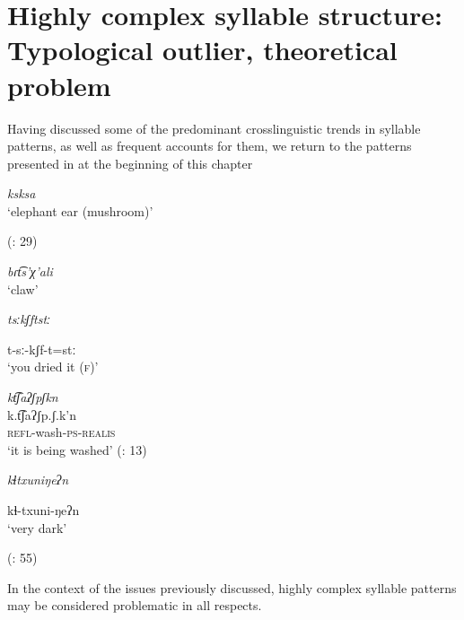 \section{Highly complex syllable structure: Typological outlier, theoretical problem}\label{sec:1.2}

  Having discussed some of the predominant crosslinguistic trends in syllable patterns, as well as frequent accounts for them, we return to the patterns presented in at the beginning of this chapter 

\ea\label{ex:1.8}

\textit{ksksa}\\
\glt ‘elephant ear (mushroom)’

(\citealt{HargusBeavert2006}: 29)
\z

\ea\label{ex:1.9}

\textit{bɾt͡s’χ’ali}\\
\glt ‘claw’
\citep[204]{Butskhrikidze2002}
\z

\ea\label{ex:1.10}

\textit{tsːkʃftstː}

t-sː-kʃf-t=stː\\
\glt ‘you dried it (\textsc{f})’
\citep[332]{Ridouane2008}
\z

\ea\label{ex:1.11}

\glll\textit{kt͡ʃaʔʃpʃkn}\\
k.t͡ʃaʔʃp.ʃ.k’n\\
\textsc{refl}-wash-\textsc{ps-realis}\\
\glt ‘it is being washed’ (\citealt{FernándezGarayHernández2006}: 13)
\z

\ea\label{ex:1.12}

\textit{kɬtxuniŋeʔn}

kɬ-txuni-ŋeʔn\\
\glt ‘very dark’

(\citealt{GeorgVolodin1999}: 55)
\z

In the context of the issues previously discussed, highly complex syllable patterns may be considered problematic in all respects.

